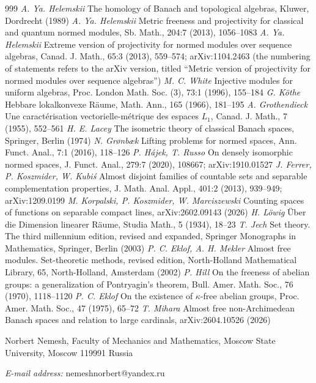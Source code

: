 \documentclass[12pt]{article}
\begin{document}
\begin{thebibliography}{999}
    \textit{A. Ya. Helemskii} The homology of Banach and topological algebras,
    Kluwer, Dordrecht (1989)
    \textit{A. Ya. Helemskii} Metric freeness and projectivity for classical
    and quantum normed modules, Sb. Math., 204:7 (2013), 1056--1083
    \textit{A. Ya. Helemskii} Extreme version of projectivity for normed
    modules over sequence algebras, Canad. J. Math., 65:3 (2013), 559--574;
    arXiv:1104.2463 (the numbering of statements refers to the arXiv
    version, titled ``Metric version of projectivity for normed modules over
    sequence algebras'')
    \textit{M. C. White} Injective modules for uniform algebras, Proc. London
    Math. Soc. (3), 73:1 (1996), 155--184
    \textit{G. K\"othe} Hebbare lokalkonvexe R\"aume, Math. Ann., 165 (1966),
    181--195
    \textit{A. Grothendieck} Une caract\'erisation vectorielle-m\'etrique des
    espaces $L_1$, Canad. J. Math., 7 (1955), 552--561
    \textit{H. E. Lacey} The isometric theory of classical Banach spaces,
    Springer, Berlin (1974)
    \textit{N. Gr{\o}nb{\ae}k} Lifting problems for normed spaces, Ann. Funct.
    Anal., 7:1 (2016), 118--126
    \textit{P. H\'ajek, T. Russo} On densely isomorphic normed spaces,
    J. Funct. Anal., 279:7 (2020), 108667; arXiv:1910.01527
    \textit{J. Ferrer, P. Koszmider, W. Kubi\'s} Almost disjoint families of
    countable sets and separable complementation properties, J. Math. Anal.
    Appl., 401:2 (2013), 939--949; arXiv:1209.0199
    \textit{M. Korpalski, P. Koszmider, W. Marciszewski} Counting spaces of
    functions on separable compact lines, arXiv:2602.09143 (2026)
    \textit{H. L\"owig} \"Uber die Dimension linearer R\"aume, Studia Math.,
    5 (1934), 18--23
    \textit{T. Jech} Set theory. The third millennium edition, revised and
    expanded, Springer Monographs in Mathematics, Springer, Berlin (2003)
    \textit{P. C. Eklof, A. H. Mekler} Almost free modules. Set-theoretic
    methods, revised edition, North-Holland Mathematical Library, 65,
    North-Holland, Amsterdam (2002)
    \textit{P. Hill} On the freeness of abelian groups: a generalization of
    Pontryagin's theorem, Bull. Amer. Math. Soc., 76 (1970), 1118--1120
    \textit{P. C. Eklof} On the existence of $\kappa$-free abelian groups,
    Proc. Amer. Math. Soc., 47 (1975), 65--72
    \textit{T. Mihara} Almost free non-Archimedean Banach spaces and relation
    to large cardinals, arXiv:2604.10526 (2026)
\end{thebibliography}

Norbert Nemesh, Faculty of Mechanics and Mathematics, Moscow State University,
Moscow 119991 Russia

\textit{E-mail address:} nemeshnorbert@yandex.ru
\end{document}
